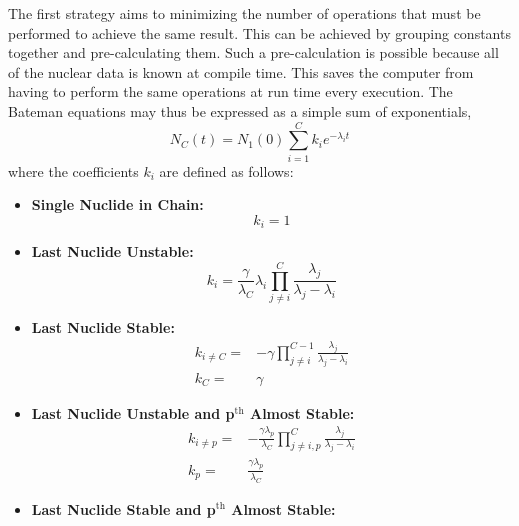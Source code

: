 \documentclass[letterpaper]{physor2018}
\newcommand{\pth}{p$^{\mathrm{th}}$\xspace}
\begin{document}
The first strategy aims to minimizing the number of
operations that must be performed to achieve the same result. This can be achieved
by grouping constants together and pre-calculating them. Such a pre-calculation is possible
because all of the nuclear data is known at compile time. This saves the computer from
having to perform the same operations at run time every execution.
The Bateman equations may thus be expressed as a simple sum of exponentials,
\begin{equation}
\label{sum-of-exp}
    N_C(t) = N_1(0) \sum_{i=1}^C k_{i} e^{-\lambda_i t}
\end{equation}
where the coefficients $k_i$ are defined as follows:
\begin{itemize}
\item \textbf{Single Nuclide in Chain:}
\begin{equation}
\label{k-single}
    k_i = 1
\end{equation}
\item \textbf{Last Nuclide Unstable:}
\begin{equation}
\label{k-last-unstable}
    k_i = \frac{\gamma}{\lambda_C} \lambda_i \prod_{j\ne i}^C \frac{\lambda_j}{\lambda_j - \lambda_i}
\end{equation}
\item \textbf{Last Nuclide Stable:}
\begin{equation}
\label{k-last-stable-0}
\begin{split}
    k_{i\ne C} = & -\gamma \prod_{j\ne i}^{C-1} \frac{\lambda_j}{\lambda_j - \lambda_i} \\
    k_C = & \gamma
\end{split}
\end{equation}
\item \textbf{Last Nuclide Unstable and \pth Almost Stable:}
\begin{equation}
\label{k-last-unstable-p-almost-stable-0}
\begin{split}
    k_{i\ne p} = & -\frac{\gamma\lambda_p}{\lambda_C} \prod_{j\ne i,p}^C \frac{\lambda_j}{\lambda_j - \lambda_i} \\
    k_p = & \frac{\gamma\lambda_p}{\lambda_C}
\end{split}
\end{equation}
\item \textbf{Last Nuclide Stable and \pth Almost Stable:}
\begin{equation}
\label{k-last-stable-p-almost-stable-0}
\end{equation}
\begin{equation}

\end{equation}
\end{itemize}
\end{document}
